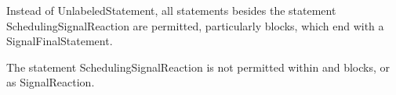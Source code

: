 \begin{grammarframe}




\end{grammarframe}


Instead of UnlabeledStatement, all statements besides the
statement SchedulingSignalReaction are permitted, particularly
blocks,  which  end with a SignalFinalStatement.

The statement SchedulingSignalReaction is not permitted within 
and  blocks, or as SignalReaction.

